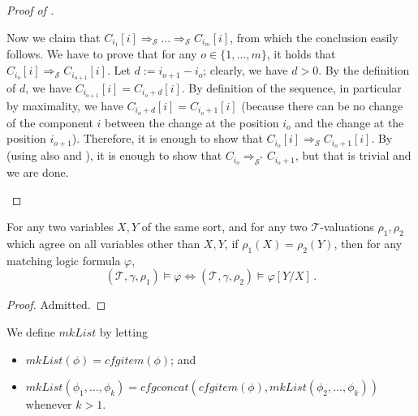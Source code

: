 \begin{proof}[Proof of ]
\begin{itemize}
          Now we claim that $C_{i_1}[i] \Rightarrow_{\mathcal{S}} \ldots \Rightarrow_{\mathcal{S}} C_{i_m}[i]$,
          from which the conclusion easily follows.
          We have to prove that for any $o \in \{ 1, \ldots, m \}$, it holds that
          $C_{i_o}[i] \Rightarrow_{\mathcal{S}} C_{i_{o+1}}[i]$.
          Let $d := i_{o+1} - i_{o}$; clearly, we have $d > 0$.
          By the definition of $d$, we have $C_{i_{o+1}}[i] = C_{i_{o} + d}[i]$.
          By definition of the sequence, in particular by maximality, we have $C_{i_{o} + d}[i] = C_{i_{o} + 1}[i]$
          (because there can be no change of the component $i$ between the change at the position $i_o$ and the change at the position $i_{o+1}$).
          Therefore, it is enough to show that
          $C_{i_o}[i] \Rightarrow_{\mathcal{S}} C_{i_{o}+1}[i]$.
          By  (using also  and ), it is enough to show that
          $C_{i_{o}} \Rightarrow_{\mathcal{S}^*} C_{i_{o}+1}$, but that is trivial and we are done.
\end{itemize}
\end{proof}

\begin{lemma}\label{lem:varrenamesem}
  For any two variables $X,Y$ of the same sort, and for any two $\mathcal{T}$-valuations $\rho_1, \rho_2$
  which agree on all variables other than $X,Y$, if $\rho_1(X) = \rho_2(Y)$, then for any matching logic formula
  $\varphi$,
  \begin{equation*}
      (\mathcal{T}, \gamma, \rho_1) \vDash \varphi \iff (\mathcal{T}, \gamma, \rho_2) \vDash \varphi[Y/X] \, .
  \end{equation*}
\end{lemma}
\begin{proof}
    Admitted.
\end{proof}



\begin{definition}\label{def:mkList}
We define $\mathit{mkList}$ by letting
\begin{itemize}
    \item $\mathit{mkList}(\phi) = \mathit{cfgitem}(\phi)$; and
    \item $\mathit{mkList}(\phi_1, \ldots, \phi_k) = \mathit{cfgconcat}(\mathit{cfgitem}(\phi), \mathit{mkList}(\phi_2, \ldots, \phi_k))$ whenever $k > 1$.
\end{itemize}
\end{definition}

